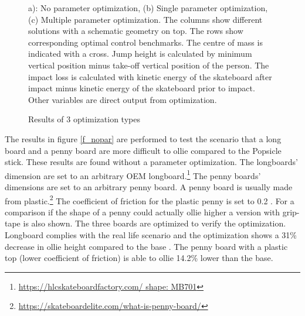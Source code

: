 \documentclass[default,iicol]{sn-jnl}
\begin{document}
{\begin{figure}[!t]
    \vspace{0.2cm}
    \caption[Geometries of optimization solutions]{Results of 3 optimization types}
    a): No parameter optimization, (b) Single parameter optimization, (c) Multiple parameter optimization. The columns show different solutions with a schematic geometry on top. The rows show corresponding optimal control benchmarks. The centre of mass is indicated with a cross. Jump height is calculated by minimum vertical position minus take-off vertical position of the person. The impact loss is calculated with kinetic energy of the skateboard after impact minus kinetic energy of the skateboard prior to impact. Other variables are direct output from optimization.
\end{figure}

\noindent The results in figure \ref{f_nopar} are performed to test the scenario that a long board and a penny board are more difficult to ollie compared to the Popsicle stick. These results are found without a parameter optimization. The longboards' dimension are set to an arbitrary OEM longboard.\footnote{\url{https://hlcskateboardfactory.com/ shape: MB701}} The penny boards' dimensions are set to an arbitrary penny board. A penny board is usually made from plastic.\footnote{\url{https://skateboardelite.com/what-is-penny-board/}} The coefficient of friction for the plastic penny is set to 0.2 \cite{bani-hani_data_2019}. For a comparison if the shape of a penny could actually ollie higher a version with grip-tape is also shown. The three boards are optimized to verify the optimization. Longboard complies with the real life scenario and the optimization shows a 31\% decrease in ollie height compared to the base . The penny board with a plastic top (lower coefficient of friction) is able to ollie 14.2\% lower than the base.

}
\end{document}
